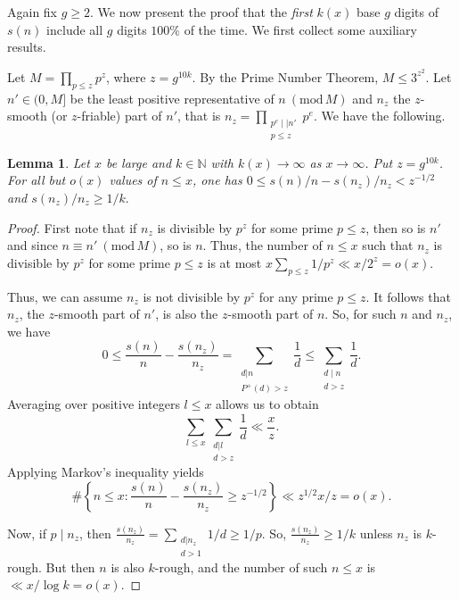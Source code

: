 \documentclass[11pt, reqno]{amsart}
\newtheorem{lemma}[theorem]{Lemma}
\theoremstyle{remark}
\numberwithin{theorem}{section}
\numberwithin{proposition}{section}
\numberwithin{lemma}{section}
\numberwithin{corollary}{section}
\numberwithin{equation}{section}
\numberwithin{conjecture}{section}
\numberwithin{definition}{section}
\renewcommand{\bmod}[1]{\ ( \mathrm{mod} \, #1 )}
\begin{document}
Again fix $g\ge 2$. We now present the proof that the \textit{first} $k(x)$ base $g$ digits of $s(n)$ include all $g$ digits $100\%$ of the time. We first collect some auxiliary results. 

Let $M = \prod_{p \leq z} p^{z}$, where $z = g^{10k}$.	By the Prime Number Theorem, $M \leq 3^{z^2}$. Let $n'\in (0,M]$ be the least positive representative of $n\bmod{M}$ and $n_{z}$ the $z$-smooth (or $z$-friable) part of $n'$, that is $n_z=\prod_{\substack{p^e\mid\mid n'\\p\leq z}}p^e$. We have the following.	
\begin{lemma}\label{lem: n to nz}
	Let $x$ be large and $k\in \mathbb{N}$ with $k(x)\to\infty$ as $x\to \infty$. Put $z = g^{10k}$.
	For all but $o(x)$ values of $n \leq x$, one has 
	$0 \leq s(n)/n - s(n_z)/n_z < z^{-1/2}$
	and $s(n_z)/n_z \geq 1/k.$
	\end{lemma}
	\begin{proof}
First note that	if $n_z$ is divisible by $p^{z}$ for some prime $p \leq z$, then so is $n'$ and since $n\equiv n'\bmod M$, so is $n$. Thus, the number of $n\leq x$ such that $n_z$ is divisible by $p^{z}$ for some prime $p \leq z$ is at most $x\sum_{p\leq z} 1/p^{z}\ll x/2^z=o(x)$.

Thus, we can assume $n_z$ is not  divisible by $p^{z}$ for any prime $p \leq z$. It follows that $n_z$, the $z$-smooth part of $n'$, is also the $z$-smooth part of $n$. 
So, for such $n$ and $n_z$, we have 
	$$0 \leq \frac{s(n)}{n} - \frac{s(n_z)}{n_z} = \sum_{\substack{d | n\\ P^+(d) >z}} \frac{1}{d} \leq \sum_{\substack{d\mid n\\ d > z}} \frac{1}{d} .$$
	Averaging over positive integers $l\leq x$ allows us to obtain 
    $$\sum_{l\leq x}\sum_{\substack{d | l\\ d > z}} \frac{1}{d} \ll \frac{x}{z}.$$ 
    Applying  Markov's inequality yields
	\[\#\left\{n\leq x: \frac{s(n)}{n} - \frac{s(n_z)}{n_z}\geq z^{-1/2}\right\}\ll z^{1/2}x/z=o(x).\]
	
	
	
	Now, if $ p\mid n_z$, then $\frac{s(n_z)}{n_z} = \sum_{\substack{d | n_z\\ d> 1}} 1/d \geq  1/p$. So,  $\frac{s(n_z)}{n_z} \geq  1/k$ unless $n_z$ is $k$-rough. But then $n$ is also $k$-rough, and the number of such $n\leq x$ is $\ll x/\log k=o(x)$.  
	\end{proof}
	

	
	
\end{document}
